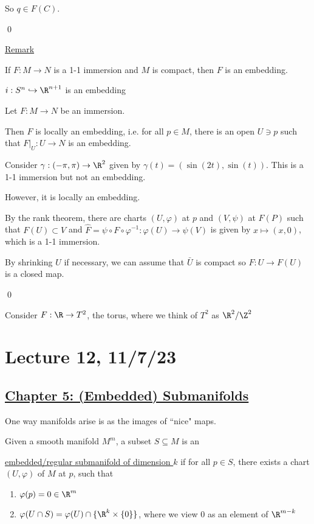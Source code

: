 \documentclass[x11names,reqno,14pt]{extarticle}
\newcommand{\into}{\hookrightarrow}
\renewcommand{\phi}{\varphi}
\begin{document}
So $q\in F(C)$. 

\qed

\underline{Remark}

If $F:M\to N$ is a 1-1 immersion and $M$ is compact, then $F$ is an embedding. 

\exm

$i:S^n\into\R^{n + 1}$ is an embedding

\thm

Let $F:M\to N$ be an immersion.

Then $F$ is locally an embedding, i.e. for all $p \in M$, there is an open $U \ni p$ such that $F|_U:U\to N$ is an embedding.

\exm

Consider $\gamma:(-\pi,\pi)\to\R^2$ given by $\gamma(t) = (\sin(2t),\sin(t))$. This is a 1-1 immersion but not an embedding. 

However, it is locally an embedding. 

\proof

By the rank theorem, there are charts $(U, \phi)$ at $p$ and $(V,\psi)$ at $F(P)$ such that $F(U) \subset V$ and $\hat{F} = \psi \circ F \circ \phi^{-1}:\phi(U) \to \psi(V)$ is given by $x \mapsto (x, 0)$, which is a 1-1 immersion. 

By shrinking $U$ if necessary, we can assume that $\bar{U}$ is compact so $F:U\to F(U)$ is a closed map. 

\qed

\exm

Consider $F:\R\to T^2$, the torus, where we think of $T^2$ as $\R^2/\Z^2$

\section*{Lecture 12, 11/7/23}

\subsection*{\underline{Chapter 5: (Embedded) Submanifolds}}

One way manifolds arise is as the images of ``nice" maps. 


Given a smooth manifold $M^m$, a subset $S \subseteq M$ is an 

\underline{embedded/regular submanifold of dimension $k$}  if for all $p \in S$, there exists a chart $(U, \phi)$ of $M$ at $p$, such that 
\begin{enumerate}

\item $\phi(p) = 0 \in \R^m$

\item $\phi(U\cap S) = \phi(U) \cap \{\R^k\times\{0\}\}$, where we view $0$ as an element of $\R^{m - k}$ 

\end{enumerate}
\end{document}
